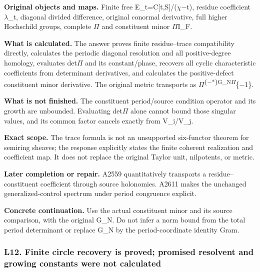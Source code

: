 \textbf{Original objects and maps.} Finite free
E\_t=C[t,S]/(\allowbreak{}\ensuremath{χ}\allowbreak{}\allowbreak{}\ensuremath{−}\allowbreak{}t),
residue coefficient \allowbreak{}\ensuremath{λ}\allowbreak{}\_t,
diagonal divided difference, original conormal derivative, full higher
Hochschild groups, complete \allowbreak{}\ensuremath{Π}\allowbreak{} and
constituent minor \allowbreak{}\ensuremath{Π}\allowbreak{}I\_F.

\textbf{What is calculated.} The answer proves finite residue--trace
compatibility directly, calculates the periodic diagonal resolution and
all positive-degree homology, evaluates
det\allowbreak{}\ensuremath{Π}\allowbreak{} and its constant/phase,
recovers all cyclic characteristic coefficients from determinant
derivatives, and calculates the positive-defect constituent minor
derivative. The original metric transports as
\allowbreak{}\ensuremath{Π}\allowbreak{}\textsuperscript{\{\allowbreak{}\ensuremath{−}\allowbreak{}*\}G\_N\allowbreak{}\ensuremath{Π}\allowbreak{}}\{\allowbreak{}\ensuremath{−}\allowbreak{}1\}.

\textbf{What is not finished.} The constituent period/source condition
operator and its growth are unbounded. Evaluating
det\allowbreak{}\ensuremath{Π}\allowbreak{} alone cannot bound those
singular values, and its common factor cancels exactly from V\_i/V\_j.

\textbf{Exact scope.} The trace formula is not an unsupported
six-functor theorem for semiring sheaves; the response explicitly states
the finite coherent realization and coefficient map. It does not replace
the original Taylor unit, nilpotents, or metric.

\textbf{Later completion or repair.} A2559 quantitatively transports a
residue--constituent coefficient through source holonomies. A2611 makes
the unchanged generalized-control spectrum under period congruence
explicit.

\textbf{Concrete continuation.} Use the actual constituent minor and its
source comparison, with the original G\_N. Do not infer a norm bound
from the total period determinant or replace G\_N by the
period-coordinate identity Gram.

\subsubsection{L12. Finite circle recovery is proved; promised resolvent
and growing constants were not
calculated}\label{l12.-finite-circle-recovery-is-proved-promised-resolvent-and-growing-constants-were-not-calculated}


